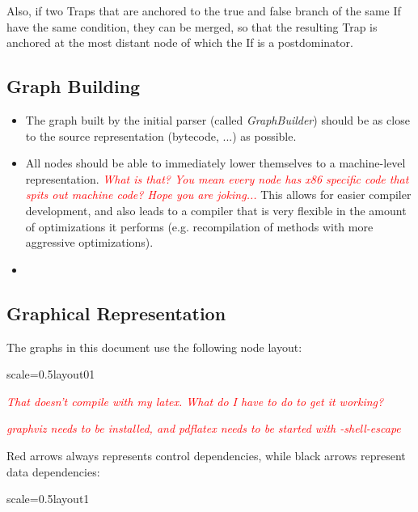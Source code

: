 \documentclass[twocolumn]{svjour3}
\newcommand{\mynote}[2]{
\textcolor{red}{\fbox{\bfseries\sffamily\scriptsize#1}
  {\small\textsf{\emph{#2}}}
\fbox{\bfseries\sffamily\scriptsize }}}
\newcommand\cw[1]{\mynote{CW}{#1}}
\newcommand\ls[1]{\mynote{LS}{#1}}
\begin{document}
Also, if two Traps that are anchored to the true and false branch of the same If have the same condition, they can be merged, so that the resulting Trap is anchored at the most distant node of which the If is a postdominator.


\subsection{Graph Building}
\begin{itemize}
    \item The graph built by the initial parser (called \emph{GraphBuilder}) should be as close to the source representation (bytecode, ...) as possible.
    \item All nodes should be able to immediately lower themselves to a machine-level representation. \cw{What is that?  You mean every node has x86 specific code that spits out machine code?  Hope you are joking...} This allows for easier compiler development, and also leads to a compiler that is very flexible in the amount of optimizations it performs (e.g. recompilation of methods with more aggressive optimizations).
    \item 
\end{itemize}

\subsection{Graphical Representation}
The graphs in this document use the following node layout:

\begin{digraphenv}{scale=0.5}{layout01}
\end{digraphenv}

\cw{That doesn't compile with my latex.  What do I have to do to get it working?}
\ls{graphviz needs to be installed, and pdflatex needs to be started with -shell-escape}

Red arrows always represents control dependencies, while black arrows represent data dependencies:

\begin{digraphenv}{scale=0.5}{layout1}
\end{digraphenv}
\end{document}
